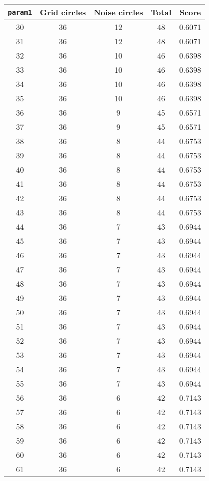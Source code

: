 \documentclass[letterpaper, 12pt]{article}
\begin{document}
\begin{longtable}{|c|c|c|c|c|}
\hline
\textbf{\texttt{param1}} & \textbf{Grid circles} & \textbf{Noise circles} & \textbf{Total} & \textbf{Score} \\
\hline
30 & 36 & 12 & 48 & 0.6071 \\
\hline
31 & 36 & 12 & 48 & 0.6071 \\
\hline
32 & 36 & 10 & 46 & 0.6398 \\
\hline
33 & 36 & 10 & 46 & 0.6398 \\
\hline
34 & 36 & 10 & 46 & 0.6398 \\
\hline
35 & 36 & 10 & 46 & 0.6398 \\
\hline
36 & 36 & 9 & 45 & 0.6571 \\
\hline
37 & 36 & 9 & 45 & 0.6571 \\
\hline
38 & 36 & 8 & 44 & 0.6753 \\
\hline
39 & 36 & 8 & 44 & 0.6753 \\
\hline
40 & 36 & 8 & 44 & 0.6753 \\
\hline
41 & 36 & 8 & 44 & 0.6753 \\
\hline
42 & 36 & 8 & 44 & 0.6753 \\
\hline
43 & 36 & 8 & 44 & 0.6753 \\
\hline
44 & 36 & 7 & 43 & 0.6944 \\
\hline
45 & 36 & 7 & 43 & 0.6944 \\
\hline
46 & 36 & 7 & 43 & 0.6944 \\
\hline
47 & 36 & 7 & 43 & 0.6944 \\
\hline
48 & 36 & 7 & 43 & 0.6944 \\
\hline
49 & 36 & 7 & 43 & 0.6944 \\
\hline
50 & 36 & 7 & 43 & 0.6944 \\
\hline
51 & 36 & 7 & 43 & 0.6944 \\
\hline
52 & 36 & 7 & 43 & 0.6944 \\
\hline
53 & 36 & 7 & 43 & 0.6944 \\
\hline
54 & 36 & 7 & 43 & 0.6944 \\
\hline
55 & 36 & 7 & 43 & 0.6944 \\
\hline
56 & 36 & 6 & 42 & 0.7143 \\
\hline
57 & 36 & 6 & 42 & 0.7143 \\
\hline
58 & 36 & 6 & 42 & 0.7143 \\
\hline
59 & 36 & 6 & 42 & 0.7143 \\
\hline
60 & 36 & 6 & 42 & 0.7143 \\
\hline
61 & 36 & 6 & 42 & 0.7143 \\

\end{longtable}
\end{document}
